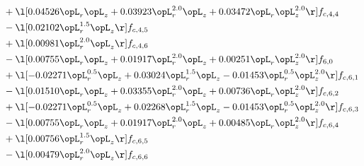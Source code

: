 \begin{alignat}{2}
& + \l[  0.04526 \opL_r \opL_z +  0.03923 \opL_r^{2.0} \opL_z +  0.03472 \opL_r \opL_z^{2.0}  \r] f_{c,4,4} \nonumber \\ 
& - \l[  0.02102 \opL_r^{1.5} \opL_z  \r] f_{c,4,5} \nonumber \\ 
& + \l[  0.00981 \opL_r^{2.0} \opL_z  \r] f_{c,4,6} \nonumber \\ 
& - \l[  0.00755 \opL_r \opL_z +  0.01917 \opL_r^{2.0} \opL_z +  0.00251 \opL_r \opL_z^{2.0}  \r] f_{6,0} \nonumber \\ 
& + \l[  -0.02271 \opL_r^{0.5} \opL_z +  0.03024 \opL_r^{1.5} \opL_z   -0.01453 \opL_r^{0.5} \opL_z^{2.0}  \r] f_{c,6,1} \nonumber \\ 
& - \l[  0.01510 \opL_r \opL_z +  0.03355 \opL_r^{2.0} \opL_z +  0.00736 \opL_r \opL_z^{2.0}  \r] f_{c,6,2} \nonumber \\ 
& + \l[  -0.02271 \opL_r^{0.5} \opL_z +  0.02268 \opL_r^{1.5} \opL_z   -0.01453 \opL_r^{0.5} \opL_z^{2.0}  \r] f_{c,6,3} \nonumber \\ 
& - \l[  0.00755 \opL_r \opL_z +  0.01917 \opL_r^{2.0} \opL_z +  0.00485 \opL_r \opL_z^{2.0}  \r] f_{c,6,4} \nonumber \\ 
& + \l[  0.00756 \opL_r^{1.5} \opL_z  \r] f_{c,6,5} \nonumber \\ 
& - \l[  0.00479 \opL_r^{2.0} \opL_z  \r] f_{c,6,6} \nonumber \\ 
\end{alignat} 


